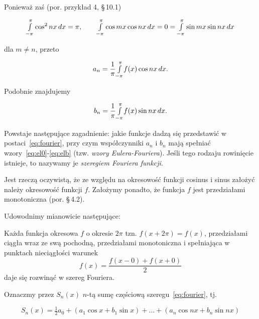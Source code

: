 \documentclass[leqno]{book}
\newcommand{\normalsign}[1]{{\normalfont{#1}}}
\newcommand{\parsign}[0]{\S\,}
\begin{document}
    Ponieważ zaś (por. przykład 4, \parsign 10.1)

    \[
        \mathsmaller{\int\limits_{-\pi}^{\pi}} \cos^2 nx \,dx = \pi, \qquad
        \mathsmaller{\int\limits_{-\pi}^{\pi}} \cos mx \cos nx \,dx = 0 = \mathsmaller{\int\limits_{-\pi}^{\pi}} \sin mx \sin nx \,dx
    \]

    dla $m \neq n$, przeto

    \begin{equation}
        \label{eq:ela}
        a_n = \frac{1}{\pi} \mathsmaller{\int\limits_{-\pi}^{\pi}} f(x) \cos nx \,dx \text{.}
    \end{equation}

    Podobnie znajdujemy

    \begin{equation}
        \label{eq:elb}
        b_n = \frac{1}{\pi} \mathsmaller{\int\limits_{-\pi}^{\pi}} f(x) \sin nx \,dx \text{.}
    \end{equation}

    Powstaje następujące zagadnienie: jakie funkcje dadzą się przedstawić w postaci~\eqref{eq:fourier}, przy czym współczynniki $a_n$ i $b_n$ mają
    spełniać wzory~\eqref{eq:el0}-\eqref{eq:elb} (tzw. \textit{wzory Eulera-Fouriera}).
    Jeśli tego rodzaju rowinięcie istnieje, to nazywamy je \textit{szeregiem Fouriera funkcji}.

    Jest rzeczą oczywistą, że ze względu na okresowość funkcji cosinus i sinus założyć należy okresowość funkcji $f$.
    Założymy ponadto, że funkcja $f$ jest przedziałami monotoniczna (por. \parsign 4.2).

    Udowodnimy mianowicie następujące:

    \begin{twierdzenie}
        Każda funkcja okresowa $f$ o okresie $2\pi$ \normalsign{(}tzn. $f(x + 2\pi) = f(x)$\normalsign{)}, przedziałami ciągła
        \normalsign{(}wraz ze swą pochodną\normalsign{)}, przedziałami monotoniczna i spełniająca
        \normalsign{(}w punktach nieciągłości\normalsign{)} warunek
        \begin{equation}
            \label{eq:statement}
            f(x) = \frac{f(x - 0) + f(x + 0)}{2}
        \end{equation}
        daje się rozwinąć w szereg Fouriera.
    \end{twierdzenie}

    Oznaczmy przez $S_n (x)$ $n$-tą sumę częściową szeregu~\eqref{eq:fourier}, tj.

    \begin{equation}
        \label{eq:sum}
        S_n(x) = \tfrac{1}{2} a_{0} + (a_1 \cos x + b_1 \sin x) + \ldots + (a_n \cos nx + b_n \sin nx)
    \end{equation}
\end{document}
